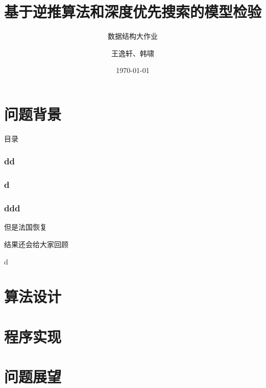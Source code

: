 \documentclass{beamer}
\title[模型检验]{基于逆推算法和深度优先搜索的模型检验}
\subtitle{数据结构大作业}
\institute{北京大学数学科学学院}
\author{王逸轩、韩啸}
\date{\today}
\begin{document}
\begin{frame}
	\titlepage
\end{frame}


\part{问题背景}
\begin{frame}
	\partpage
\end{frame}

\begin{frame}{目录}
	\tableofcontents
\end{frame}

\section{dd}
\begin{frame}
	
	
\end{frame}
\section{d}
\section{ddd}
\begin{frame}{但是}{法国恢复}
	
	结果还会给大家回顾

d
\end{frame}

\part{算法设计}
\part{程序实现}
\part{问题展望}
\end{document}
